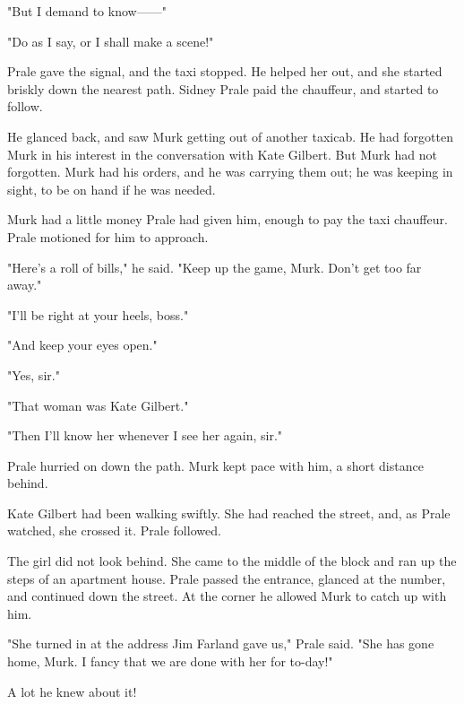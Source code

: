 \documentclass{novel}
\begin{document}
"But I demand to know------"

"Do as I say, or I shall make a scene!"

Prale gave the signal, and the taxi stopped. He helped her out, and she started briskly down the nearest path. Sidney Prale paid the chauffeur, and started to follow.

He glanced back, and saw Murk getting out of another taxicab. He had forgotten Murk in his interest in the conversation with Kate Gilbert. But Murk had not forgotten. Murk had his orders, and he was carrying them out; he was keeping in sight, to be on hand if he was needed.

Murk had a little money Prale had given him, enough to pay the taxi chauffeur. Prale motioned for him to approach.

"Here's a roll of bills," he said. "Keep up the game, Murk. Don't get too far away."

"I'll be right at your heels, boss."

"And keep your eyes open."

"Yes, sir."

"That woman was Kate Gilbert."

"Then I'll know her whenever I see her again, sir."

Prale hurried on down the path. Murk kept pace with him, a short distance behind.

Kate Gilbert had been walking swiftly. She had reached the street, and, as Prale watched, she crossed it. Prale followed.

The girl did not look behind. She came to the middle of the block and ran up the steps of an apartment house. Prale passed the entrance, glanced at the number, and continued down the street. At the corner he allowed Murk to catch up with him.

"She turned in at the address Jim Farland gave us," Prale said. "She has gone home, Murk. I fancy that we are done with her for to-day!"

A lot he knew about it!

\vspace{2\nbs}
\clearpage
\thispagestyle{empty}

\begin{ChapterStart}
\vspace{3\nbs}
\end{ChapterStart}
    
\end{document}
